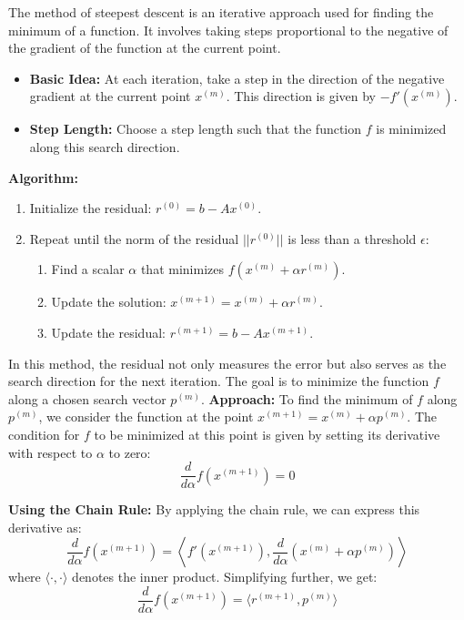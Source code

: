 \documentclass[unicode,11pt,a4paper,oneside,numbers=endperiod,openany]{scrartcl}
\begin{document}
The method of steepest descent is an iterative approach used for finding the minimum of a function. It involves taking steps proportional to the negative of the gradient of the function at the current point.

\begin{itemize}
    \item \textbf{Basic Idea:} At each iteration, take a step in the direction of the negative gradient at the current point \( x^{(m)} \). This direction is given by \( -f'(x^{(m)}) \).

    \item \textbf{Step Length:} Choose a step length such that the function \( f \) is minimized along this search direction.
\end{itemize}

\textbf{Algorithm:}
\begin{enumerate}
    \item Initialize the residual: \( r^{(0)} = b - Ax^{(0)} \).

    \item Repeat until the norm of the residual \( ||r^{(0)}|| \) is less than a threshold \( \epsilon \):
    \begin{enumerate}
        \item Find a scalar \( \alpha \) that minimizes \( f(x^{(m)} + \alpha r^{(m)}) \).

        \item Update the solution: \( x^{(m+1)} = x^{(m)} + \alpha r^{(m)} \).

        \item Update the residual: \( r^{(m+1)} = b - Ax^{(m+1)} \).
    \end{enumerate}
\end{enumerate}

In this method, the residual not only measures the error but also serves as the search direction for the next iteration.
\newline \newline
The goal is to minimize the function \( f \) along a chosen search vector \( p^{(m)} \).
\newline
\textbf{Approach:}
To find the minimum of \( f \) along \( p^{(m)} \), we consider the function at the point \( x^{(m+1)} = x^{(m)} + \alpha p^{(m)} \). The condition for \( f \) to be minimized at this point is given by setting its derivative with respect to \( \alpha \) to zero:
\[
\frac{d}{d\alpha} f(x^{(m+1)}) = 0
\]

\textbf{Using the Chain Rule:}
By applying the chain rule, we can express this derivative as:
\[
\frac{d}{d\alpha} f(x^{(m+1)}) = \left\langle f'(x^{(m+1)}), \frac{d}{d\alpha}(x^{(m)} + \alpha p^{(m)}) \right\rangle
\]
where \( \langle \cdot, \cdot \rangle \) denotes the inner product. Simplifying further, we get:
\[
\frac{d}{d\alpha} f(x^{(m+1)}) = \langle r^{(m+1)}, p^{(m)} \rangle
\]
\end{document}
